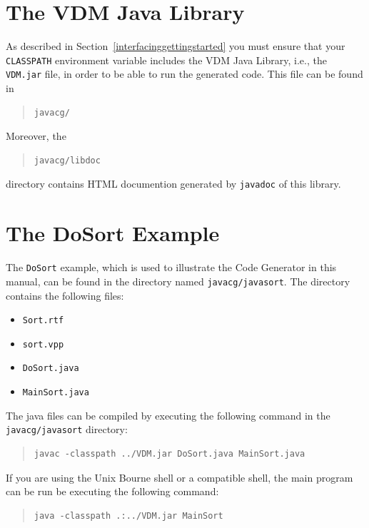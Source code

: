\documentclass[\pformat,11pt]{article}
\newcommand{\JL}{VDM Java Library}
\begin{document}
\newpage
\section{The VDM Java Library}\label{VDMJavalib}

As described in Section~\ref{interfacinggettingstarted} you must
ensure that your {\tt CLASSPATH} environment variable includes the
\JL{}, i.e., the {\tt VDM.jar} file, in order to be able to run the
generated code.  This file can be found in

\begin{quote}
\begin{verbatim}
javacg/
\end{verbatim}
\end{quote}

Moreover, the 

\begin{quote}
\begin{verbatim}
javacg/libdoc
\end{verbatim}
\end{quote}
directory contains HTML documention generated by {\tt javadoc} of this library.

\newpage
\section{The DoSort Example}\label{dosortexample}
The \texttt{DoSort} example, which is used to illustrate the Code Generator in
this manual, can be found in the directory named {\tt javacg/javasort}. The
directory contains the following files:

\begin{itemize}
\item {\tt Sort.rtf}
\item {\tt sort.vpp}
\item {\tt DoSort.java}
\item {\tt MainSort.java}
\end{itemize}

The java files can be compiled by executing the following command in the {\tt javacg/javasort} directory:

\begin{quote}
\begin{verbatim}
javac -classpath ../VDM.jar DoSort.java MainSort.java
\end{verbatim}
\end{quote}

If you are using the Unix Bourne shell or a compatible shell, the main program can be run be executing the following command:
\begin{quote}
\begin{verbatim}
java -classpath .:../VDM.jar MainSort
\end{verbatim}
\end{quote}
\end{document}

